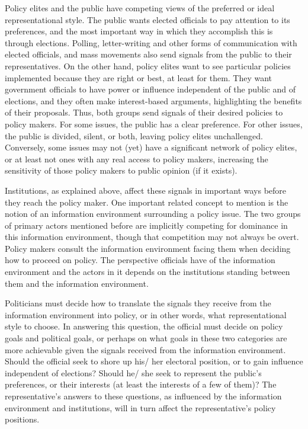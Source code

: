 Policy elites and the public have competing views of the preferred or ideal representational style. The public wants elected officials to pay attention to its preferences, and the most important way in which they accomplish this is through elections. Polling, letter-writing and other forms of communication with elected officials, and mass movements also send signals from the public to their representatives. On the other hand, policy elites want to see particular policies implemented because they are right or best, at least for them. They want government officials to have power or influence independent of the public and of elections, and they often make interest-based arguments, highlighting the benefits of their proposals. Thus, both groups send signals of their desired policies to policy makers. For some issues, the public has a clear preference. For other issues, the public is divided, silent, or both, leaving policy elites unchallenged. Conversely, some issues may not (yet) have a significant network of policy elites, or at least not ones with any real access to policy makers, increasing the sensitivity of those policy makers to public opinion (if it exists).

Institutions, as explained above, affect these signals in important ways before they reach the policy maker. One important related concept to mention is the notion of an information environment surrounding a policy issue. The two groups of primary actors mentioned before are implicitly competing for dominance in this information environment, though that competition may not always be overt. Policy makers consult the information environment facing them when deciding how to proceed on policy. The perspective officials have of the information environment and the actors in it depends on the institutions standing between them and the information environment.

Politicians must decide how to translate the signals they receive from the information environment into policy, or in other words, what representational style to choose. In answering this question, the official must decide on policy goals and political goals, or perhaps on what goals in these two categories are more achievable given the signals received from the information environment. Should the official seek to shore up his/ her electoral position, or to gain influence independent of elections? Should he/ she seek to represent the public's preferences, or their interests (at least the interests of a few of them)? The representative's answers to these questions, as influenced by the information environment and institutions, will in turn affect the representative's policy positions.

